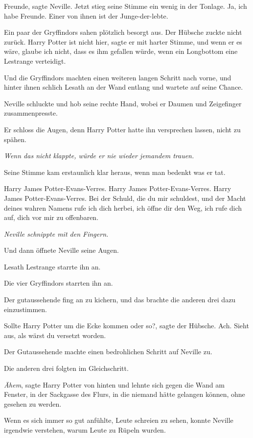 \glqq{}Freunde\grqq{}, sagte Neville. Jetzt stieg seine Stimme ein wenig in der
Tonlage. \glqq{}Ja, ich habe Freunde. Einer von ihnen ist der
Junge-der-lebte.\grqq{}

Ein paar der Gryffindors sahen plötzlich besorgt aus. Der Hübsche zuckte nicht
zurück. \glqq{}Harry Potter ist nicht hier\grqq{}, sagte er mit harter Stimme,
\glqq{}und wenn er es wäre, glaube ich nicht, dass es ihm gefallen würde, wenn
ein Longbottom eine Lestrange verteidigt.\grqq{}

Und die Gryffindors machten einen weiteren langen Schritt nach vorne, und hinter
ihnen schlich Lesath an der Wand entlang und wartete auf seine Chance.

Neville schluckte und hob seine rechte Hand, wobei er Daumen und Zeigefinger
zusammenpresste.

Er schloss die Augen, denn Harry Potter hatte ihn versprechen lassen, nicht zu
spähen.

\emph{Wenn das nicht klappte, würde er nie wieder jemandem trauen.}

Seine Stimme kam erstaunlich klar heraus, wenn man bedenkt was er tat.

\glqq{}Harry James Potter-Evans-Verres. Harry James Potter-Evans-Verres. Harry
James Potter-Evans-Verres. Bei der Schuld, die du mir schuldest, und der Macht
deines wahren Namens rufe ich dich herbei, ich öffne dir den Weg, ich rufe dich
auf, dich vor mir zu offenbaren.\grqq{}

\emph{Neville schnippte mit den Fingern.}

Und dann öffnete Neville seine Augen.

Lesath Lestrange starrte ihn an.

Die vier Gryffindors starrten ihn an.

Der gutaussehende fing an zu kichern, und das brachte die anderen drei dazu
einzustimmen.

\glqq{}Sollte Harry Potter um die Ecke kommen oder so?\grqq{}, sagte der
Hübsche. \glqq{}Ach. Sieht aus, als wärst du versetzt worden.\grqq{}

Der Gutaussehende machte einen bedrohlichen Schritt auf Neville zu.

Die anderen drei folgten im Gleichschritt.

\glqq{}\emph{Ähem}\grqq{}, sagte Harry Potter von hinten und lehnte sich gegen
die Wand am Fenster, in der Sackgasse des Flurs, in die niemand hätte gelangen
können, ohne gesehen zu werden.

Wenn es sich immer so gut anfühlte, Leute schreien zu sehen, konnte Neville
irgendwie verstehen, warum Leute zu Rüpeln wurden.

